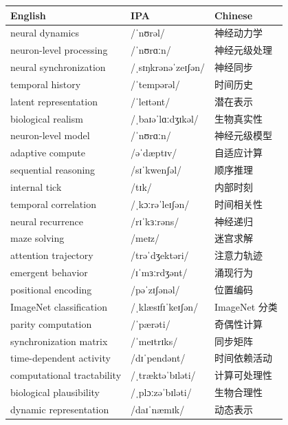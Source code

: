 \documentclass[UTF8,12pt,a4paper]{ctexart}
\providecommand{\zh}[1]{#1}
\begin{document}
\begin{tabular*}{\textwidth}{@{\extracolsep{\fill}}lll@{}}
\toprule
\textbf{English} & \textbf{IPA} & \textbf{Chinese} \\
\midrule
neural dynamics & {\ipafont /ˈnʊrəl/} & \zh{神经动力学} \\
neuron-level processing & {\ipafont /ˈnʊrɑːn/} & \zh{神经元级处理} \\
neural synchronization & {\ipafont /ˌsɪŋkrənəˈzeɪʃən/} & \zh{神经同步} \\
temporal history & {\ipafont /ˈtempərəl/} & \zh{时间历史} \\
latent representation & {\ipafont /ˈleɪtənt/} & \zh{潜在表示} \\
biological realism & {\ipafont /ˌbaɪəˈlɑːdʒɪkəl/} & \zh{生物真实性} \\
neuron-level model & {\ipafont /ˈnʊrɑːn/} & \zh{神经元级模型} \\
adaptive compute & {\ipafont /əˈdæptɪv/} & \zh{自适应计算} \\
sequential reasoning & {\ipafont /sɪˈkwenʃəl/} & \zh{顺序推理} \\
internal tick & {\ipafont /tɪk/} & \zh{内部时刻} \\
temporal correlation & {\ipafont /ˌkɔːrəˈleɪʃən/} & \zh{时间相关性} \\
neural recurrence & {\ipafont /rɪˈkɜːrəns/} & \zh{神经递归} \\
maze solving & {\ipafont /meɪz/} & \zh{迷宫求解} \\
attention trajectory & {\ipafont /trəˈdʒektəri/} & \zh{注意力轨迹} \\
emergent behavior & {\ipafont /ɪˈmɜːrdʒənt/} & \zh{涌现行为} \\
positional encoding & {\ipafont /pəˈzɪʃənəl/} & \zh{位置编码} \\
ImageNet classification & {\ipafont /ˌklæsɪfɪˈkeɪʃən/} & \zh{ImageNet 分类} \\
parity computation & {\ipafont /ˈpærəti/} & \zh{奇偶性计算} \\
synchronization matrix & {\ipafont /ˈmeɪtrɪks/} & \zh{同步矩阵} \\
time-dependent activity & {\ipafont /dɪˈpendənt/} & \zh{时间依赖活动} \\
computational tractability & {\ipafont /ˌtræktəˈbɪləti/} & \zh{计算可处理性} \\
biological plausibility & {\ipafont /ˌplɔːzəˈbɪləti/} & \zh{生物合理性} \\
dynamic representation & {\ipafont /daɪˈnæmɪk/} & \zh{动态表示} \\

\end{tabular*}
\end{document}
